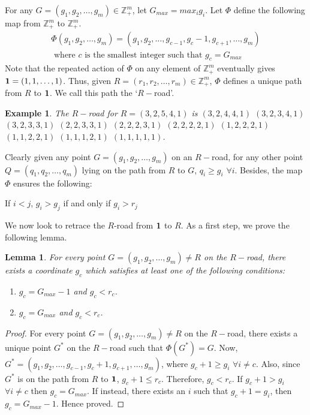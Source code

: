 \documentclass[letterpaper, 12 pt]{article}  \usepackage{amssymb}
\newtheorem{example}[theorem]{Example}
\newtheorem{lemma}[theorem]{Lemma}
\begin{document}
 For any $G = (g_1,g_2,\ldots,g_m) \in \mathbb{Z}_+^m$, let $G_{max}
 = max_ig_i$. Let $\Phi$ define the following map from $\mathbb{Z}_+^m$ to
$\mathbb{Z}_+^m$. 
\begin{eqnarray*}
 \Phi(g_1,g_2,\ldots,g_m) = (g_1,g_2,\ldots,g_{c-1},g_c -
1,g_{c+1},\ldots,g_m)\\ \textrm{ where } c \textrm{ is the smallest integer such
that }g_c =G_{max}
\end{eqnarray*}
Note that the repeated action of $\Phi$ on any element of
$\mathbb{Z}_+^m$ eventually gives ${\bf 1} = (1,1,\ldots,1)$. Thus, given
$R = (r_1,r_2,\ldots,r_m) \in \mathbb{Z}_+^m$, $\Phi$
defines a unique path from $R $ to ${\bf 1}$. We call this path the `$R-$road'.
\begin{example}
 The $R-$road for $R = (3, 2, 5, 4, 1)$ 
is $(3,2,4,4,1)$ $(3,2,3,4,1)$ $(3,2,3,3,1)$ $(2,2,3,3,1)$ $(2,2,2,3,1)$ $
(2,2,2,2,1)$ $(1,2,2,2,1)$ $(1,1,2,2,1)$ $(1,1,1,2,1)$ $(1,1,1,1,1)$.
\end{example}
Clearly given any point $G=(g_1,g_2,\ldots,g_m)$ on an $R-$road, for any
other point
$Q = (q_1,q_2,\ldots,q_m)$ lying on the path from $R$ to $G$, $q_i
\geq g_i$ $\forall i$. Besides, the map $\Phi$ ensures
the following: \begin{itemize}{\item[-] If $i<j$, $g_i> g_j$ if and only if $g_i
> r_j$}\end{itemize} 


We now look to retrace the $R$-road from ${\bf 1}$ to $R$. As a first step, we
prove the following lemma.

\begin{lemma}
For every point $G = (g_1,g_2,\ldots,g_m) \neq R$ on the $R-$road, there exists
a coordinate $g_c$ which satisfies
at least one of the following conditions:
\begin{enumerate}
 \item $g_c = G_{max}-1$ and $g_c<r_c$.
 \item $g_c = G_{max}$ and $g_c<r_c$.
\end{enumerate}
\end{lemma}

\begin{proof}
 For every point $G = (g_1,g_2,\ldots,g_m) \neq R$ on the $R-$road, there exists
a unique point $G^*$ on the $R-$road such that $\Phi(G^*) = G$.
Now, $G^* = (g_1,g_2,\ldots,g_{c-1},g_c+1,g_{c+1},\ldots,g_m)$, where $g_c+1
\geq g_i$ $\forall i \neq c$. Also, since $G^*$ is on the path from $R$ to
${\bf 1}$, $g_{c}+1 \leq r_c$. Therefore, $g_c<r_c$. If $g_c+1>g_i$
$\forall i \neq c$ then $g_c = G_{max}$. If instead, there exists an $i$ such
that $g_c+1 = g_i$, then $g_c = G_{max}-1$. Hence proved.
\end{proof}
\end{document}

